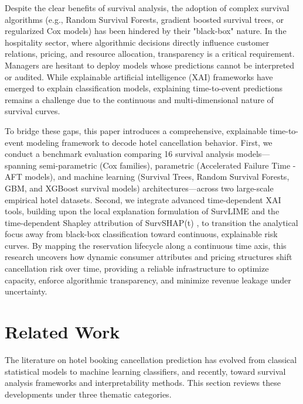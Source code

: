 \documentclass[pdflatex,sn-mathphys-ay]{sn-jnl}%
\theoremstyle{thmstyleone}%
\theoremstyle{thmstyletwo}%
\theoremstyle{thmstylethree}%
\begin{document}
Despite the clear benefits of survival analysis, the adoption of complex survival algorithms (e.g., Random Survival Forests, gradient boosted survival trees, or regularized Cox models) has been hindered by their "black-box" nature. In the hospitality sector, where algorithmic decisions directly influence customer relations, pricing, and resource allocation, transparency is a critical requirement. Managers are hesitant to deploy models whose predictions cannot be interpreted or audited. While explainable artificial intelligence (XAI) frameworks have emerged to explain classification models, explaining time-to-event predictions remains a challenge due to the continuous and multi-dimensional nature of survival curves. 

To bridge these gaps, this paper introduces a comprehensive, explainable time-to-event modeling framework to decode hotel cancellation behavior. First, we conduct a benchmark evaluation comparing 16 survival analysis models—spanning semi-parametric (Cox families), parametric (Accelerated Failure Time - AFT models), and machine learning (Survival Trees, Random Survival Forests, GBM, and XGBoost survival models) architectures—across two large-scale empirical hotel datasets. Second, we integrate advanced time-dependent XAI tools, building upon the local explanation formulation of SurvLIME \citep{kovalev2020survlime} and the time-dependent Shapley attribution of SurvSHAP(t) \citep{krzyzinski2023survshapt}, to transition the analytical focus away from black-box classification toward continuous, explainable risk curves. By mapping the reservation lifecycle along a continuous time axis, this research uncovers how dynamic consumer attributes and pricing structures shift cancellation risk over time, providing a reliable infrastructure to optimize capacity, enforce algorithmic transparency, and minimize revenue leakage under uncertainty.


\section{Related Work}
\label{sec:related_work}

The literature on hotel booking cancellation prediction has evolved from classical statistical models to machine learning classifiers, and recently, toward survival analysis frameworks and interpretability methods. This section reviews these developments under three thematic categories.
\end{document}
